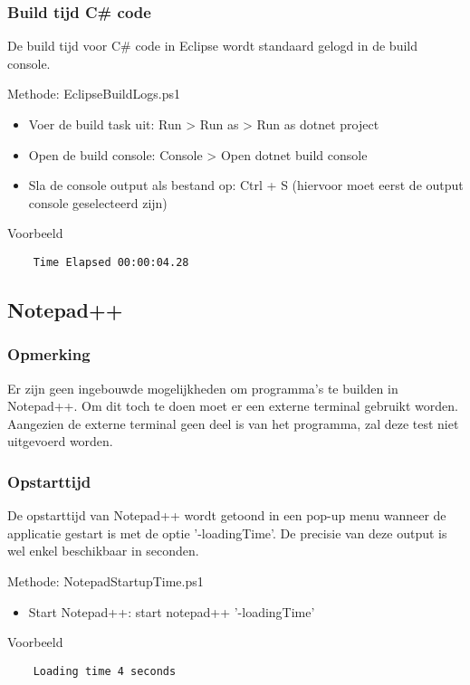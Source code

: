 \subsubsection{Build tijd C\# code}
De build tijd voor C\# code in Eclipse wordt standaard gelogd in de build console.

Methode: EclipseBuildLogs.ps1
\begin{itemize}
	\item Voer de build task uit: Run > Run as > Run as dotnet project
	\item Open de build console: Console > Open dotnet build console
    \item Sla de console output als bestand op: Ctrl + S (hiervoor moet eerst de output console geselecteerd zijn)
\end{itemize}

Voorbeeld
\vspace{\verbatimOffset}
\begin{verbatim}
    Time Elapsed 00:00:04.28   
\end{verbatim}

\subsection{Notepad++}
\subsubsection{Opmerking}
Er zijn geen ingebouwde mogelijkheden om programma's te builden in Notepad++. Om dit toch te doen moet er een externe terminal gebruikt worden. Aangezien de externe terminal geen deel is van het programma, zal deze test niet uitgevoerd worden.

\subsubsection{Opstarttijd}
De opstarttijd van Notepad++ wordt getoond in een pop-up menu wanneer de applicatie gestart is met de optie '-loadingTime'. De precisie van deze output is wel enkel beschikbaar in seconden.

Methode: NotepadStartupTime.ps1
\begin{itemize}
	\item Start Notepad++: start notepad++ '-loadingTime'
\end{itemize}

Voorbeeld
\vspace{\verbatimOffset}
\begin{verbatim}
    Loading time 4 seconds
\end{verbatim}

